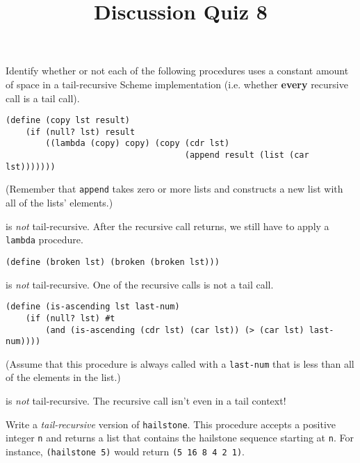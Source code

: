 \documentclass[twoside]{article}
\title{\sc Discussion Quiz 8 \solution{Solutions}}
\newcommand{\solution}[1]{{\color{red}#1}}
\begin{document}
\thispagestyle{empty}
\maketitle

\begin{enumerate}

Identify whether or not each of the following procedures uses a constant amount of space in a tail-recursive Scheme implementation (i.e. whether \textbf{every} recursive call is a tail call).

\begin{lstlisting}
(define (copy lst result)
    (if (null? lst) result
        ((lambda (copy) copy) (copy (cdr lst)
                                    (append result (list (car lst)))))))
\end{lstlisting}

(Remember that {\tt append} takes zero or more lists and constructs a new list with all of the lists' elements.)

\solution{{\tt copy} is \emph{not} tail-recursive. After the recursive call returns, we still have to apply a {\tt lambda} procedure.}
\newline

\begin{lstlisting}
(define (broken lst) (broken (broken lst)))
\end{lstlisting}

\solution{{\tt broken} is \emph{not} tail-recursive. One of the recursive calls is not a tail call.}
\newline

\begin{lstlisting}
(define (is-ascending lst last-num)
    (if (null? lst) #t
        (and (is-ascending (cdr lst) (car lst)) (> (car lst) last-num))))
\end{lstlisting}

(Assume that this procedure is always called with a {\tt last-num} that is less than all of the elements in the list.)

\solution{{\tt is-ascending} is \emph{not} tail-recursive. The recursive call isn't even in a tail context!}
\newline


Write a \emph{tail-recursive} version of {\tt hailstone}. This procedure accepts a positive integer {\tt n} and returns a list that contains the hailstone sequence starting at {\tt n}. For instance, {\tt (hailstone 5)} would return {\tt (5 16 8 4 2 1)}.


\end{enumerate}
\end{document}
